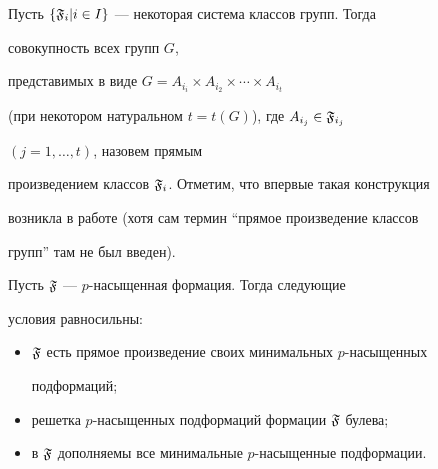  


Пусть $\{\frak F_i\vert i\in I\}$ --- некоторая система классов групп. Тогда 


совокупность всех групп $G$, 


представимых в виде $G=A_{i_i}\times A_{i_2}\times\dotsb\times A_{i_t}$ 


(при некотором натуральном $t=t(G)$), где $A_{i_j}\in\frak F_{i_j}$ 


$(j=1,\dotsc,t)$, назовем прямым 


произведением классов $\frak F_i$. Отметим, что впервые такая конструкция 


возникла в работе \cite{Vas} (хотя сам термин ``прямое произведение классов 


групп'' там не был введен). 


 


\begin{thm} Пусть $\frak F$ --- $p$-насыщенная формация. Тогда следующие 


условия равносильны: 


\begin{itemize} 


\item[1)] $\frak F$ есть прямое произведение своих минимальных $p$-насыщенных 


подформаций; 


\item[2)] решетка $p$-насыщенных подформаций формации $\frak F$ булева; 


\item[3)] в $\frak F$ дополняемы все минимальные $p$-насыщенные подформации. 


\end{itemize} 


\end{thm} 


 


